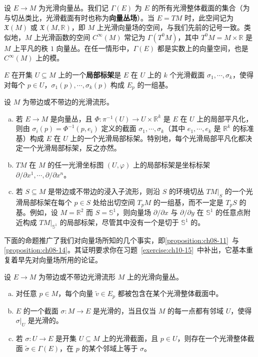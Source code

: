 \documentclass[../../main.tex]{subfiles}
\begin{document}
设 $E\to M$ 为光滑向量丛。我们记 $\Gamma(E)$ 为 $E$ 的所有光滑整体截面的集合（为与切丛类比，光滑截面有时也称为\textbf{向量丛场}）。当 $E=TM$ 时，此空间记为 $\mathfrak X(M)$ 或 $\mathfrak X(M,\mathbb{R})$，即 $M$ 上光滑向量场的空间，与我们先前的记号一致。类似地，$M$ 上光滑函数的空间 $C^\infty(M)$ 常记为 $\Gamma(T^0M)$，其中 $T^0M=M\times\mathbb{R}$ 是 $M$ 上平凡的秩 $1$ 向量丛。在任一情形中，$\Gamma(E)$ 都是实数上的向量空间，也是 $C^\infty(M)$ 上的模。

$E$ 在开集 $U\subseteq M$ 上的一个\textbf{局部标架}是 $E$ 在 $U$ 上的 $k$ 个光滑截面 $\sigma_1,\cdots ,\sigma_k$，使得对每个 $p\in U$，$\sigma_1(p),\cdots ,\sigma_k(p)$ 构成 $E_p$ 的一组基。

\begin{example}[局部标架]\label{example:ch10-局部标架}
设 $M$ 为带边或不带边的光滑流形。
\begin{enumerate}[(a)]
\item 若 $E\to M$ 是向量丛，且 $\Phi\colon\pi^{-1}(U)\to U\times\mathbb{R}^k$ 是 $E$ 在 $U$ 上的局部平凡化，则由 $\sigma_i(p)=\Phi^{-1}(p,e_i)$ 定义的截面 $\sigma_1,\cdots ,\sigma_k$（其中 $e_1,\cdots ,e_k$ 是 $\mathbb{R}^k$ 的标准基）构成 $E$ 在 $U$ 上的一个光滑局部标架。特别地，每个光滑局部平凡化都决定一个光滑局部标架，反之亦然。
\item $TM$ 在 $M$ 的任一光滑坐标图 $(U,\varphi)$ 上的局部标架是坐标标架 $\partial/\partial x^1,\cdots ,\partial/\partial x^n$。
\item 若 $S\subseteq M$ 是带边或不带边的浸入子流形，则沿 $S$ 的环境切丛 $TM|_S$ 的一个光滑局部标架在每个 $p\in S$ 处给出切空间 $T_pM$ 的一组基，而不一定是 $T_pS$ 的基。例如，设 $M=\mathbb{R}^2$ 而 $S=\mathbb{S}^1$，则向量场 $\partial/\partial x$ 与 $\partial/\partial y$ 在 $\mathbb{S}^1$ 的任意点附近构成 $TM|_{\mathbb{S}^1}$ 的局部标架，尽管其中没有一个是切于 $\mathbb{S}^1$ 的。
\end{enumerate}
\end{example}

下面的命题推广了我们对向量场所知的几个事实，即\cref{proposition:ch08-11}~与\cref{proposition:ch08-14}。其证明要求你在习题~\ref{exercise:ch10-15}~中补出，它基本重复着早先对向量场所用的论证。

\begin{proposition}[光滑截面的存在性]\label{proposition:ch10-光滑截面存在性}
设 $E\to M$ 为带边或不带边光滑流形 $M$ 上的光滑向量丛。
\begin{enumerate}[(a)]
\item 对任意 $p\in M$，每个向量 $\tilde v\in E_p$ 都被包含在某个光滑整体截面中。
\item $E$ 的一个截面 $\sigma\colon M\to E$ 是光滑的，当且仅当 $M$ 的每一点都有邻域 $U$，使得 $\sigma|_U$ 是光滑的。
\item 若 $\sigma\colon U\to E$ 是开集 $U\subseteq M$ 上的光滑截面，且 $p\in U$，则存在一个光滑整体截面 $\widetilde\sigma\in\Gamma(E)$，在 $p$ 的某个邻域上等于 $\sigma$。
\end{enumerate}
\end{proposition}
\end{document}
